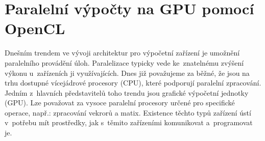%

\chapter{Paralelní výpočty na GPU pomocí OpenCL}
\label{ch:opencl}
Dnešním trendem ve vývoji architektur pro výpočetní zařízení je umožnění paralelního provádění
úloh. Paralelizace typicky vede ke~znatelnému zvýšení výkonu u~zařízeních ji využívajících. Dnes již
považujeme za běžné, že jsou na trhu dostupné vícejádrové procesory (CPU), které podporují paralelní
zpracování. Jedním z~hlavních představitelů toho trendu jsou grafické výpočetní jednotky (GPU). Lze
považovat za vysoce paralelní procesory určené pro specifické operace, např.: zpracování vekrorů a
matix. Existence těchto typů zařízení ústí v~potřebu mít prostředky, jak s~těmito zařízeními
komunikovat a~programovat je.

